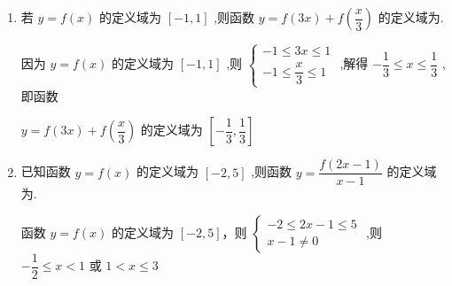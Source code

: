 \begin{enumerate}
\begin{jieda}
        $\therefore f\left( {x}^{2}\right)$ 的定义域是 $\left\lbrack  {-2, - \sqrt{2}}\right\rbrack   \cup  \left\lbrack  {\sqrt{2},2}\right\rbrack$ .
    \end{jieda}
    \item 若 $y = f\left( x\right)$ 的定义域为 $\left\lbrack  {-1,1}\right\rbrack$ ,则函数 $y = f\left( {3x}\right)  + f\left( \dfrac{x}{3}\right)$ 的定义域为.
    \begin{jieda}
        因为 $y = f\left( x\right)$ 的定义域为 $\left\lbrack  {-1,1}\right\rbrack$ ,则 $\left\{  \begin{array}{l}  - 1 \leq  {3x} \leq  1 \\   - 1 \leq  \dfrac{x}{3} \leq  1 \end{array}\right.$ ,解得 $- \dfrac{1}{3} \leq  x \leq  \dfrac{1}{3}$ ,即函数
        
        $y = f\left( {3x}\right)  + f\left( \dfrac{x}{3}\right)$ 的定义域为 $\left\lbrack  {-\dfrac{1}{3},\dfrac{1}{3}}\right\rbrack$
    \end{jieda}
    \item 已知函数 $y = f\left( x\right)$ 的定义域为 $\left\lbrack  {-2,5}\right\rbrack$ ,则函数 $y = \dfrac{f\left( {{2x} - 1}\right) }{x - 1}$ 的定义域为.
    \begin{jieda}
        函数 $y = f\left( x\right)$ 的定义域为 $\left\lbrack  {-2,5}\right\rbrack$，则 $\left\{  \begin{array}{l}  - 2 \leq  {2x} - 1 \leq  5 \\  x - 1 \neq  0 \end{array}\right.$ ,则 $- \dfrac{1}{2} \leq  x < 1$ 或 $1 < x \leq  3$
        

\end{jieda}
\end{enumerate}
